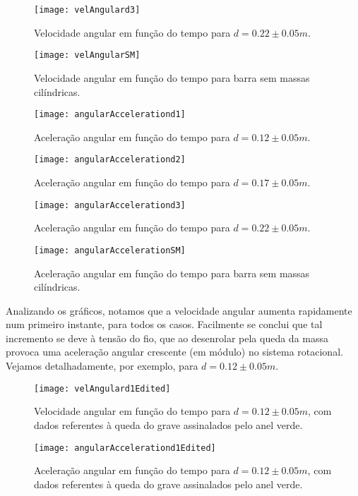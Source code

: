 \documentclass[11pt]{report}
\begin{document}
\begin{figure} [H]
\center
\texttt{[image: velAngulard3]}
\caption{Velocidade angular em função do tempo para $d=0.22\pm0.05 m $. \label{figura:5.3}}
\end{figure}

\begin{figure} [H]
\center
\texttt{[image: velAngularSM]}
\caption{Velocidade angular em função do tempo para barra sem massas cilíndricas. \label{figura:5.4}}
\end{figure}

\begin{figure} [H]
\texttt{[image: angularAccelerationd1]}
\caption{Aceleração angular em função do tempo para $d=0.12\pm0.05 m $. \label{figura:5.5}}
\end{figure}

\begin{figure} [H]
\center
\texttt{[image: angularAccelerationd2]}
\caption{Aceleração angular em função do tempo para $d=0.17\pm0.05 m $. \label{figura:5.6}}
\end{figure}

\begin{figure} [H]
\center
\texttt{[image: angularAccelerationd3]}
\caption{Aceleração angular em função do tempo para $d=0.22\pm0.05 m $. \label{figura:5.7}}
\end{figure}

\begin{figure} [H]
\center
\texttt{[image: angularAccelerationSM]}
\caption{Aceleração angular em função do tempo para barra sem massas cilíndricas. \label{figura:5.8}}
\end{figure}


Analizando os gráficos, notamos que a velocidade angular aumenta rapidamente num primeiro instante, para todos os casos. Facilmente se conclui que tal incremento se deve à tensão do fio, que ao desenrolar pela queda da massa provoca uma aceleração angular crescente (em módulo) no sistema rotacional. Vejamos detalhadamente, por exemplo, para $d=0.12\pm0.05 m $.\\
\begin{figure} [H]
\center
\texttt{[image: velAngulard1Edited]}
\caption{Velocidade angular em função do tempo para $d=0.12\pm0.05 m $, com dados referentes à queda do grave assinalados pelo anel verde. \label{figura:5.9}}
\end{figure}

\begin{figure} [H]
\center
\texttt{[image: angularAccelerationd1Edited]}
\caption{Aceleração angular em função do tempo para $d=0.12\pm0.05 m $, com dados referentes à queda do grave assinalados pelo anel verde. \label{figura:5.10}}
\end{figure}
\end{document}
